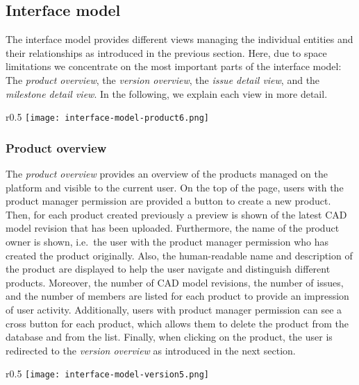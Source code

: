\subsection{Interface model}

The interface model provides different views managing the individual entities and their relationships as introduced in the previous section.
Here, due to space limitations we concentrate on the most important parts of the interface model: The \textit{product overview}, the \textit{version overview}, the \textit{issue detail view}, and the \textit{milestone detail view}.
In the following, we explain each view in more detail.

\begin{wrapfigure}{r}{0.5\textwidth}
    \centering
    \texttt{[image: interface-model-product6.png]}
    \label{fig:screenshot-product}
\end{wrapfigure}

\subsubsection{Product overview}

The \textit{product overview} provides an overview of the products managed on the platform and visible to the current user.
On the top of the page, users with the product manager permission are provided a button to create a new product.
Then, for each product created previously a preview is shown of the latest CAD model revision that has been uploaded.
Furthermore, the name of the product owner is shown, i.e.\ the user with the product manager permission who has created the product originally.
Also, the human-readable name and description of the product are displayed to help the user navigate and distinguish different products.
Moreover, the number of CAD model revisions, the number of issues, and the number of members are listed for each product to provide an impression of user activity.
Additionally, users with product manager permission can see a cross button for each product, which allows them to delete the product from the database and from the list.
Finally, when clicking on the product, the user is redirected to the \textit{version overview} as introduced in the next section.

\begin{wrapfigure}{r}{0.5\textwidth}
    \centering
    \texttt{[image: interface-model-version5.png]}
    \label{fig:screenshot-version}
\end{wrapfigure}

